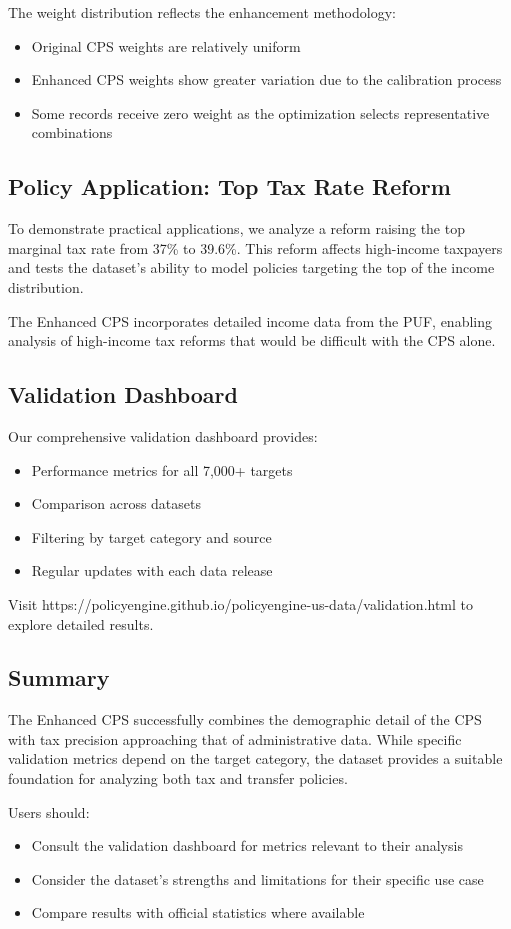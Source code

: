 The weight distribution reflects the enhancement methodology:

\begin{itemize}
\item Original CPS weights are relatively uniform
\item Enhanced CPS weights show greater variation due to the calibration process
\item Some records receive zero weight as the optimization selects representative combinations
\end{itemize}

\subsection{Policy Application: Top Tax Rate Reform}

To demonstrate practical applications, we analyze a reform raising the top marginal tax rate from 37\% to 39.6\%. This reform affects high-income taxpayers and tests the dataset's ability to model policies targeting the top of the income distribution.

The Enhanced CPS incorporates detailed income data from the PUF, enabling analysis of high-income tax reforms that would be difficult with the CPS alone.

\subsection{Validation Dashboard}

Our comprehensive validation dashboard provides:
\begin{itemize}
\item Performance metrics for all 7,000+ targets
\item Comparison across datasets
\item Filtering by target category and source
\item Regular updates with each data release
\end{itemize}

Visit https://policyengine.github.io/policyengine-us-data/validation.html to explore detailed results.

\subsection{Summary}

The Enhanced CPS successfully combines the demographic detail of the CPS with tax precision approaching that of administrative data. While specific validation metrics depend on the target category, the dataset provides a suitable foundation for analyzing both tax and transfer policies.

Users should:
\begin{itemize}
\item Consult the validation dashboard for metrics relevant to their analysis
\item Consider the dataset's strengths and limitations for their specific use case
\item Compare results with official statistics where available
\end{itemize}
